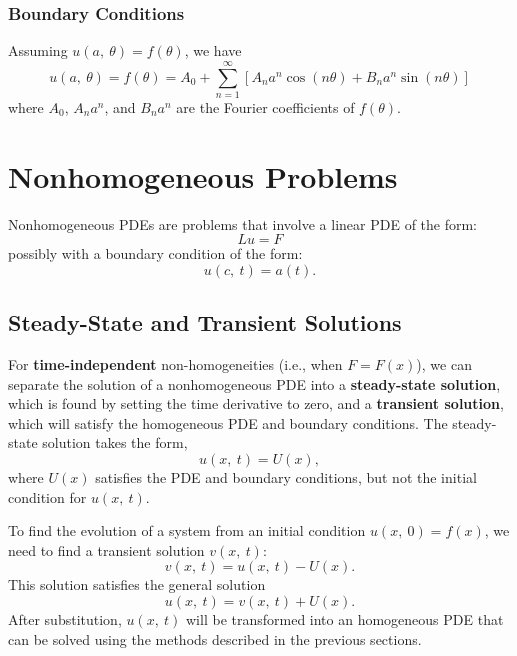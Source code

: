 \documentclass{article}
\begin{document}
\subsubsection{Boundary Conditions}
Assuming \(u\left( a,\: \theta \right) = f\left( \theta \right)\), we have
\begin{equation*}
    u\left( a,\: \theta \right) = f\left( \theta \right) = A_0 + \sum_{n = 1}^\infty \left[ A_n a^n \cos{\left( n \theta \right)} + B_n a^n \sin{\left( n \theta \right)} \right]
\end{equation*}
where \(A_0\), \(A_n a^n\), and \(B_n a^n\) are the Fourier coefficients of \(f\left( \theta \right)\).
\section{Nonhomogeneous Problems}
Nonhomogeneous PDEs are problems that involve a linear PDE of the form:
\begin{equation*}
    L u = F
\end{equation*}
possibly with a boundary condition of the form:
\begin{equation*}
    u\left( c,\: t \right) = a\left( t \right).
\end{equation*}
\subsection{Steady-State and Transient Solutions}
For \textbf{time-independent} non-homogeneities (i.e., when \(F = F\left( x \right)\)), we can separate the solution of a nonhomogeneous PDE into a \textbf{steady-state solution}, which is found by setting the time
derivative to zero, and a \textbf{transient solution}, which will satisfy the homogeneous PDE and boundary conditions.
The steady-state solution takes the form,
\begin{equation*}
    u\left( x,\: t \right) = U\left( x \right),
\end{equation*}
where \(U\left( x \right)\) satisfies the PDE and boundary conditions, but not the initial condition for \(u\left( x,\: t \right)\).

To find the evolution of a system from an initial condition \(u\left( x,\: 0 \right) = f\left( x \right)\),
we need to find a transient solution \(v\left( x,\: t \right)\):
\begin{equation*}
    v\left( x,\: t \right) = u\left( x,\: t \right) - U\left( x \right).
\end{equation*}
This solution satisfies the general solution
\begin{equation*}
    u\left( x,\: t \right) = v\left( x,\: t \right) + U\left( x \right).
\end{equation*}
After substitution, \(u\left( x,\: t \right)\) will be transformed into an homogeneous PDE that
can be solved using the methods described in the previous sections.
\end{document}
